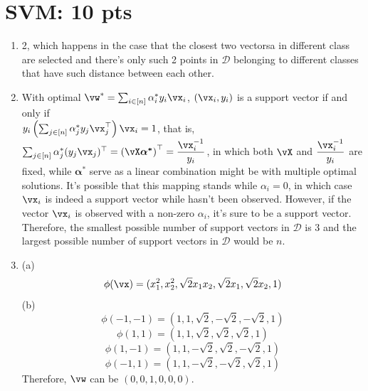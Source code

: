 \documentclass[12pt]{article}
\begin{document}
\section{SVM: 10 pts}
\begin{enumerate}
    \item 2, which happens in the case that the closest two vectorsa in different class are
    selected and there's only such 2 points in $\mathcal{D}$ belonging to different classes that have such distance between each other.
    \item With optimal $\vw^*=\sum_{i\in[n]}\alpha_i^{*}y_i \vx_i$,
    $(\vx_i,y_i)$ is a support vector if and only if\\
    $y_i\left(\sum_{j\in[n]}\alpha_j^{*}y_j\vx^{\top}_j\right)\vx_i = 1$, that is, $\sum_{j\in[n]}\alpha_j^{*}(y_j\vx_j)^{\top} = \left(\vX\boldsymbol{\alpha^*}\right)^{\top} = \dfrac{\vx_i^{-1}}{y_i}$, in which both $\vX$ and $\dfrac{\vx_i^{-1}}{y_i}$ are fixed, while $\boldsymbol{\alpha^*}$ serve as a linear combination might be with multiple optimal solutions.
    It's possible that this mapping stands while $\alpha_i=0$, in which case $\vx_i$ is indeed a support vector while hasn't been observed. However, if the vector $\vx_i$ is observed with a non-zero $\alpha_i$, it's sure to be a support vector. Therefore, the smallest possible number of support vectors in $\mathcal{D}$ is 3 and the largest possible number of support vectors in $\mathcal{D}$ would be $n$.
    \item (a) \[\phi(\vx) = (x_1^2, x_2^2, \sqrt2x_1x_2, \sqrt2x_1, \sqrt2x_2, 1)\]
    (b)
    \[\phi(-1, -1) = (1, 1, \sqrt2, -\sqrt2, -\sqrt2, 1)\]
    \[\phi(1, 1) = (1, 1, \sqrt2, \sqrt2, \sqrt2, 1)\]
    \[\phi(1, -1) = (1, 1, -\sqrt2, \sqrt2, -\sqrt2, 1)\]
    \[\phi(-1, 1) = (1, 1, -\sqrt2, -\sqrt2, \sqrt2, 1)\]
    Therefore, $\vw$ can be $(0, 0, 1, 0, 0, 0)$.
\end{enumerate}

\end{document}

